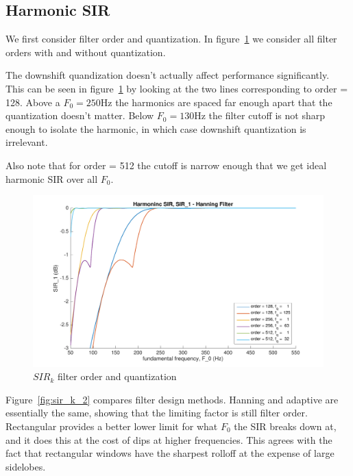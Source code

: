 \documentclass [11pt, proquest,oneside] {uwthesis}[2015/03/03]
\begin{document}
\subsection{Harmonic SIR}

We first consider filter order and quantization.  In figure~\ref{fig:sir_k_1} we consider all filter orders with and without quantization.

The downshift quandization doesn't actually affect performance significantly.  This can be seen in figure~\ref{fig:sir_k_1} by looking at the two lines corresponding to order = 128.  Above a $F_0 = 250$Hz the harmonics are spaced far enough apart that the quantization doesn't matter.  Below $F_0 = 130$Hz the filter cutoff is not sharp enough to isolate the harmonic, in which case downshift quantization is irrelevant.

Also note that for order = 512 the cutoff is narrow enough that we get ideal harmonic SIR over all $F_0$.

\begin{figure}[!ht]
  \centering
    \includegraphics[width=1\textwidth]{sir_k_1}   
    \caption{$SIR_k$ filter order and quantization}\label{fig:sir_k_1}
\end{figure}

Figure~\ref{fig:sir_k_2} compares filter design methods.  Hanning and adaptive are essentially the same, showing that the limiting factor is still filter order.  Rectangular provides a better lower limit for what $F_0$ the SIR breaks down at, and it does this at the cost of dips at higher frequencies.  This agrees with the fact that rectangular windows have the sharpest rolloff at the expense of large sidelobes.
\end{document}
